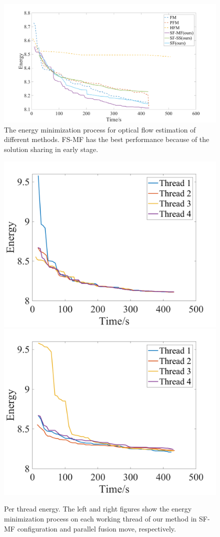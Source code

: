 

\begin{figure}[tb]
  \includegraphics[width=\columnwidth]{figure/optical_flow_convergence.png}
  \caption{The energy minimization process for optical flow estimation of different methods. FS-MF has the best performance because of the solution sharing in early stage.}\label{fig:optical_flow_convergence}
\end{figure}
\begin{figure}[tb]
  \includegraphics[width=0.5\columnwidth]{figure/optical_flow_SF_MF_threads.png}
  \includegraphics[width=0.5\columnwidth]{figure/optical_flow_PFM_threads.png}
  \caption{Per thread energy. The left and right figures show the energy minimization process on each working thread of our method in SF-MF configuration and parallel fusion move, respectively.}\label{fig:optical_flow_by_threads}
\end{figure}
